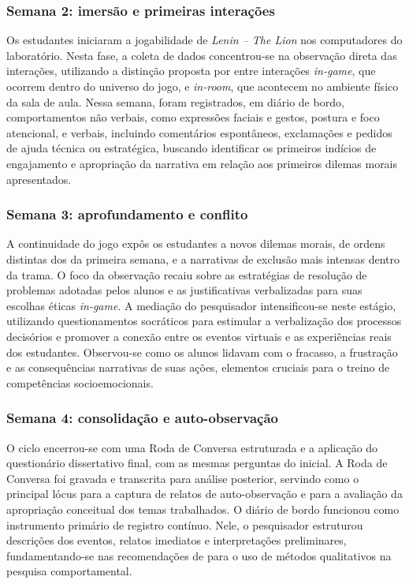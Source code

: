 \documentclass[portuguese]{textolivre}
\begin{document}
\subsubsection{Semana 2: imersão e primeiras interações}

Os estudantes iniciaram a jogabilidade de \textit{Lenin – The Lion} nos computadores do laboratório. Nesta fase, a coleta de dados concentrou-se na observação direta das interações, utilizando a distinção proposta por \textcite{lieberoth2015mixed} entre interações \textit{in-game}, que ocorrem dentro do universo do jogo, e \textit{in-room}, que acontecem no ambiente físico da sala de aula. Nessa semana, foram registrados, em diário de bordo, comportamentos não verbais, como expressões faciais e gestos, postura e foco atencional, e verbais, incluindo comentários espontâneos, exclamações e pedidos de ajuda técnica ou estratégica, buscando identificar os primeiros indícios de engajamento e apropriação da narrativa em relação aos primeiros dilemas morais apresentados.

\subsubsection{Semana 3: aprofundamento e conflito}

A continuidade do jogo expôs os estudantes a novos dilemas morais, de ordens distintas dos da primeira semana, e a narrativas de exclusão mais intensas dentro da trama. O foco da observação recaiu sobre as estratégias de resolução de problemas adotadas pelos alunos e as justificativas verbalizadas para suas escolhas éticas \textit{in-game}. A mediação do pesquisador intensificou-se neste estágio, utilizando questionamentos socráticos para estimular a verbalização dos processos decisórios e promover a conexão entre os eventos virtuais e as experiências reais dos estudantes. Observou-se como os alunos lidavam com o fracasso, a frustração e as consequências narrativas de suas ações, elementos cruciais para o treino de competências socioemocionais.

\subsubsection{Semana 4: consolidação e auto-observação}

O ciclo encerrou-se com uma Roda de Conversa estruturada e a aplicação do questionário dissertativo final, com as mesmas perguntas do inicial. A Roda de Conversa foi gravada e transcrita para análise posterior, servindo como o principal lócus para a captura de relatos de auto-observação e para a avaliação da apropriação conceitual dos temas trabalhados. O diário de bordo funcionou como instrumento primário de registro contínuo. Nele, o pesquisador estruturou descrições dos eventos, relatos imediatos e interpretações preliminares, fundamentando-se nas recomendações de \textcite{burney2024qualitative} para o uso de métodos qualitativos na pesquisa comportamental.
\end{document}
